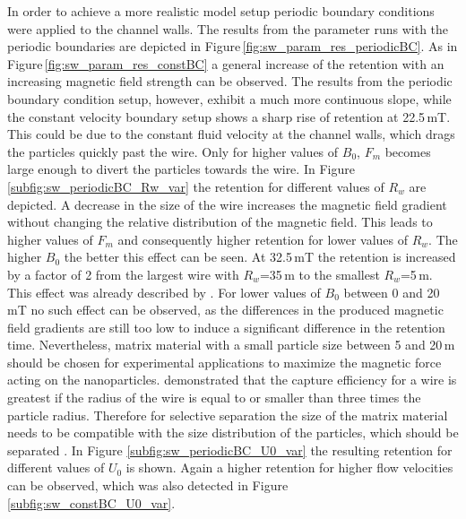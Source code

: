\FloatBarrier
In order to achieve a more realistic model setup periodic boundary conditions were applied to the channel walls. The results from the parameter runs with the periodic boundaries are depicted in Figure\,\ref{fig:sw_param_res_periodicBC}. As in Figure\,\ref{fig:sw_param_res_constBC} a general increase of the retention with an increasing magnetic field strength can be observed. The results from the periodic boundary condition setup, however, exhibit a much more continuous slope, while the constant velocity boundary setup shows a sharp rise of retention at 22.5\,mT. This could be due to the constant fluid velocity at the channel walls, which drags the particles quickly past the wire. Only for higher values of $B_{0}$, $F_{m}$ becomes large enough to divert the particles towards the wire. In Figure \ref{subfig:sw_periodicBC_Rw_var} the retention for different values of $R_{w}$ are depicted. A decrease in the size of the wire increases the magnetic field gradient without changing the relative distribution of the magnetic field. This leads to higher values of $F_{m}$ and consequently higher retention for lower values of $R_{w}$. The higher $B_{0}$ the better this effect can be seen. At 32.5\,mT the retention is increased by a factor of 2 from the largest wire with $R_{w}$=35\,\textmu m to the smallest $R_{w}$=5\,\textmu m. This effect was already described by \cite{aharoni1976traction}. For lower values of $B_{0}$ between 0 and 20\,mT no such effect can be observed, as the differences in the produced magnetic field gradients are still too low to induce a significant difference in the retention time. Nevertheless, matrix material with a small particle size between 5 and 20\,\textmu m should be chosen for experimental applications to maximize the magnetic force acting on the nanoparticles. \cite{oberteuffer1974magnetic} demonstrated that the capture efficiency for a wire is greatest if the radius of the wire is equal to or smaller than three times the particle radius. Therefore for selective separation the size of the matrix material needs to be compatible with the size distribution of the particles, which should be separated \cite{ge2017magnetic}. In Figure \ref{subfig:sw_periodicBC_U0_var} the resulting retention for different values of  $U_{0}$ is shown. Again a higher retention for higher flow velocities can be observed, which was also detected in Figure \,\ref{subfig:sw_constBC_U0_var}. 


